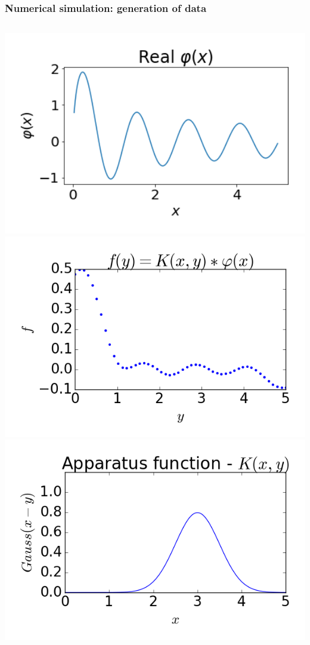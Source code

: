 \documentclass[8pt,pdf,hyperref={unicode}]{beamer}
\begin{document}
\begin{frame}
   \frametitle{Numerical simulation: generation of data}
   \begin{columns}
       \includegraphics[width=1\textwidth]{image/fig01.png}\\
       \includegraphics[width=1\textwidth]{image/fig03.png}
       \includegraphics[width=1\textwidth]{image/fig02.png}\\

\end{columns}
\end{frame}
\end{document}
